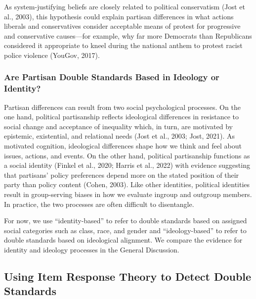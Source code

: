 \documentclass[12pt, letterpaper]{article}
\begin{document}
As system-justifying beliefs are closely related to political
conservatism (Jost et al., 2003), this hypothesis could explain partisan
differences in what actions liberals and conservatives consider
acceptable means of protest for progressive and conservative
causes---for example, why far more Democrats than Republicans considered
it appropriate to kneel during the national anthem to protest racist
police violence (YouGov, 2017).

\hypertarget{are-partisan-double-standards-based-in-ideology-or-identity}{%
\subsubsection{Are Partisan Double Standards Based in Ideology or
Identity?}\label{are-partisan-double-standards-based-in-ideology-or-identity}}

Partisan differences can result from two social psychological processes.
On the one hand, political partisanship reflects ideological differences
in resistance to social change and acceptance of inequality which, in
turn, are motivated by epistemic, existential, and relational needs
(Jost et al., 2003; Jost, 2021). As motivated cognition, ideological
differences shape how we think and feel about issues, actions, and
events. On the other hand, political partisanship functions as a social
identity (Finkel et al., 2020; Harris et al., 2022) with evidence
suggesting that partisans' policy preferences depend more on the stated
position of their party than policy content (Cohen, 2003). Like other
identities, political identities result in group-serving biases in how
we evaluate ingroup and outgroup members. In practice, the two processes
are often difficult to disentangle.

For now, we use ``identity-based'' to refer to double standards based on
assigned social categories such as class, race, and gender and
``ideology-based'' to refer to double standards based on ideological
alignment. We compare the evidence for identity and ideology processes
in the General Discussion.

\hypertarget{using-item-response-theory-to-detect-double-standards}{%
\subsection{Using Item Response Theory to Detect Double
Standards}\label{using-item-response-theory-to-detect-double-standards}}
\end{document}
